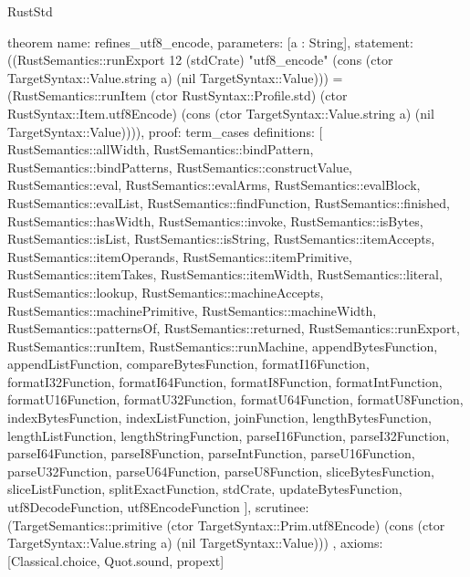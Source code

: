 \begin{lexlean}{RustStd}
\begin{semanticmodule}
theorem{
  name: refines_utf8_encode,
  parameters: [a : String],
  statement: ((RustSemantics::runExport 12 (stdCrate) "utf8_encode" (cons (ctor TargetSyntax::Value.string a) (nil TargetSyntax::Value))) = (RustSemantics::runItem (ctor RustSyntax::Profile.std) (ctor RustSyntax::Item.utf8Encode) (cons (ctor TargetSyntax::Value.string a) (nil TargetSyntax::Value)))),
  proof: term_cases{
    definitions: [
      RustSemantics::allWidth,
      RustSemantics::bindPattern,
      RustSemantics::bindPatterns,
      RustSemantics::constructValue,
      RustSemantics::eval,
      RustSemantics::evalArms,
      RustSemantics::evalBlock,
      RustSemantics::evalList,
      RustSemantics::findFunction,
      RustSemantics::finished,
      RustSemantics::hasWidth,
      RustSemantics::invoke,
      RustSemantics::isBytes,
      RustSemantics::isList,
      RustSemantics::isString,
      RustSemantics::itemAccepts,
      RustSemantics::itemOperands,
      RustSemantics::itemPrimitive,
      RustSemantics::itemTakes,
      RustSemantics::itemWidth,
      RustSemantics::literal,
      RustSemantics::lookup,
      RustSemantics::machineAccepts,
      RustSemantics::machinePrimitive,
      RustSemantics::machineWidth,
      RustSemantics::patternsOf,
      RustSemantics::returned,
      RustSemantics::runExport,
      RustSemantics::runItem,
      RustSemantics::runMachine,
      appendBytesFunction,
      appendListFunction,
      compareBytesFunction,
      formatI16Function,
      formatI32Function,
      formatI64Function,
      formatI8Function,
      formatIntFunction,
      formatU16Function,
      formatU32Function,
      formatU64Function,
      formatU8Function,
      indexBytesFunction,
      indexListFunction,
      joinFunction,
      lengthBytesFunction,
      lengthListFunction,
      lengthStringFunction,
      parseI16Function,
      parseI32Function,
      parseI64Function,
      parseI8Function,
      parseIntFunction,
      parseU16Function,
      parseU32Function,
      parseU64Function,
      parseU8Function,
      sliceBytesFunction,
      sliceListFunction,
      splitExactFunction,
      stdCrate,
      updateBytesFunction,
      utf8DecodeFunction,
      utf8EncodeFunction
    ],
    scrutinee: (TargetSemantics::primitive (ctor TargetSyntax::Prim.utf8Encode) (cons (ctor TargetSyntax::Value.string a) (nil TargetSyntax::Value)))
  },
  axioms: [Classical.choice, Quot.sound, propext]
}


\end{semanticmodule}
\end{lexlean}
